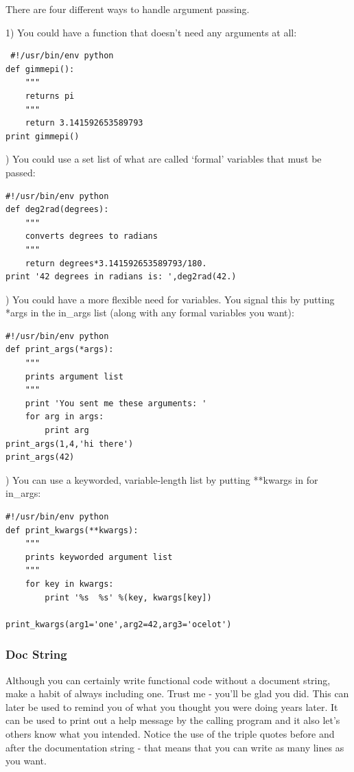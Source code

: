 \documentclass[11pt]{book}
\begin{document}
{ There are four different ways to handle argument passing. 
 
 1) You could have a function that doesn't  need any arguments at all:
 
 { \color{blue} \begin{verbatim}
 #!/usr/bin/env python
def gimmepi():  
    """
    returns pi
    """
    return 3.141592653589793
print gimmepi()
\end{verbatim}}

)  You could use  a set list of what are called `formal' variables that must be passed:  
 

{ \color{blue} \begin{verbatim}
#!/usr/bin/env python
def deg2rad(degrees):  
    """
    converts degrees to radians
    """
    return degrees*3.141592653589793/180.
print '42 degrees in radians is: ',deg2rad(42.)
\end{verbatim}}
    
) You could have a more flexible need for variables.  You signal this by putting  *args in the in\_args list (along with any formal variables you want):

{ \color{blue} \begin{verbatim}
#!/usr/bin/env python
def print_args(*args):
    """
    prints argument list
    """
    print 'You sent me these arguments: '
    for arg in args:
        print arg
print_args(1,4,'hi there')
print_args(42)
\end{verbatim}}

) You can use a keyworded, variable-length list by putting **kwargs in for in\_args:

{ \color{blue} \begin{verbatim}
#!/usr/bin/env python
def print_kwargs(**kwargs):
    """
    prints keyworded argument list
    """
    for key in kwargs:
        print '%s  %s' %(key, kwargs[key])
     
print_kwargs(arg1='one',arg2=42,arg3='ocelot')
\end{verbatim}}

 \subsubsection{Doc String}
 Although you can certainly write functional code without a document string, make a habit of always including one.  Trust me - you'll be glad you did.  This can later be used to remind you of what you thought you were doing years later.  It can be used to print out a help message by the calling program and it also let's others know what you intended.   Notice the use of the triple quotes before and after the documentation string - that means that you can write as many lines as you want.  
 
}
\end{document}
